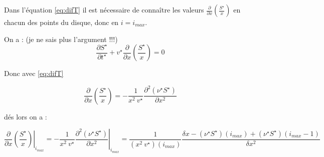 Dans l'équation \eqref{eq:difT} il est nécessaire de connaître les valeurs $\frac{\partial}{\partial x}\left(\frac{S^{\star}}{x}\right)$ en chacun des points du disque, donc en $i=i_{max}$. 

On a : (je ne sais plus l'argument !!!)
\begin{equation}
  \frac{\partial S^{\star}}{\partial t^{\star}} + v^{\star} \frac{\partial}{\partial x} \left(\frac{S^{\star}}{x}\right)=0
\end{equation}

Donc avec \eqref{eq:difT}

\begin{equation}
  \frac{\partial}{\partial x} \left(\frac{S^{\star}}{x}\right) = -\frac{1}{x^2\ v^{\star}} \frac{\partial^2 (\nu^{\star} S^{\star})}{\partial x^2}
\end{equation}

dés lors on a :

\begin{equation}
\left. \frac{\partial}{\partial x} \left(\frac{S^{\star}}{x}\right) \right|_{i_{max}} = \left. -\frac{1}{x^2\ v^{\star}} \frac{\partial^2 (\nu^{\star} S^{\star})}{\partial x^2} \right|_{i_{max}} = \frac{1}{(x^2\ v^{\star})(i_{max})} \frac{\delta x - (\nu^{\star} S^{\star})(i_{max}) + (\nu^{\star} S^{\star})(i_{max}-1)}{\delta x^2}
\end{equation}


